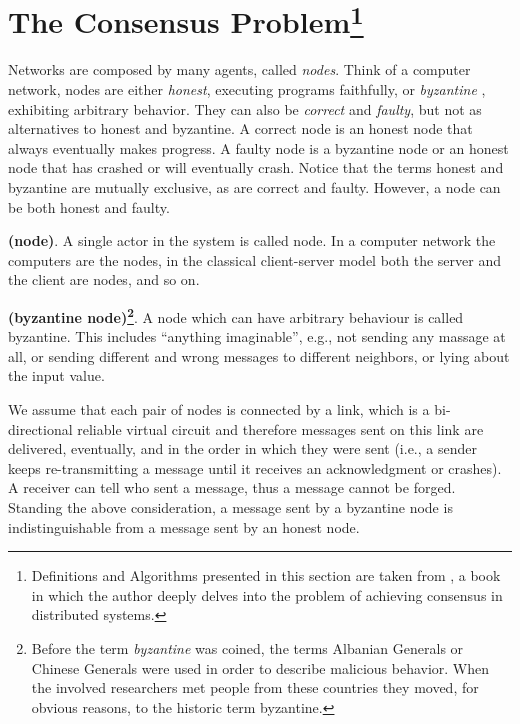 \section[The Consensus Problem]{The Consensus Problem\footnote{Definitions and Algorithms presented in this section are taken from \cite{Wattenhofer:2016:SB:3002702}, a book in which the author deeply delves into the problem of achieving consensus in distributed systems.}}
\label{sec:consensus-problem}
Networks are composed by many agents, called \textit{nodes}. Think of a computer network, nodes are either \textit{honest}, executing programs faithfully, or \textit{byzantine} \cite{Lamport:1982:BGP:357172.357176}, exhibiting arbitrary behavior. They can also be \textit{correct} and \textit{faulty}, but not as alternatives to honest and byzantine. A correct node is an honest node that always eventually makes progress. A faulty node is a byzantine node or an honest node that has crashed or will eventually crash. Notice that the terms honest and byzantine
are mutually exclusive, as are correct and faulty. However, a node can be both honest and faulty.
\begin{mydef} {\bf (node)}.
    A single actor in the system is called node. In a computer network the computers are the nodes, in the classical client-server model both the server and the client are nodes, and so on.
\end{mydef}
\begin{mydef} {\bf (byzantine node)\footnote{Before the term \textit{byzantine} was coined, the terms Albanian Generals or Chinese Generals were used in order to describe malicious behavior. When the involved researchers met people from these countries they moved, for obvious reasons, to the historic term byzantine.}}.
    \label{def:byzantine-node}
    A node which can have arbitrary behaviour is called byzantine. This includes \enquote{anything imaginable}, e.g., not sending any massage at all, or sending different and wrong messages to different neighbors, or lying about the input value.
\end{mydef}

\bigskip
\noindent
We assume that each pair of nodes is connected by a link, which is a bi-directional reliable virtual circuit
and therefore messages sent on this link are delivered, eventually, and in the order in which they were sent
(i.e., a sender keeps re-transmitting a message until it receives an acknowledgment or crashes). A receiver can tell who sent a message, thus a message cannot be forged. Standing the above consideration, a message sent by a byzantine node is indistinguishable from a message sent by an honest node.

